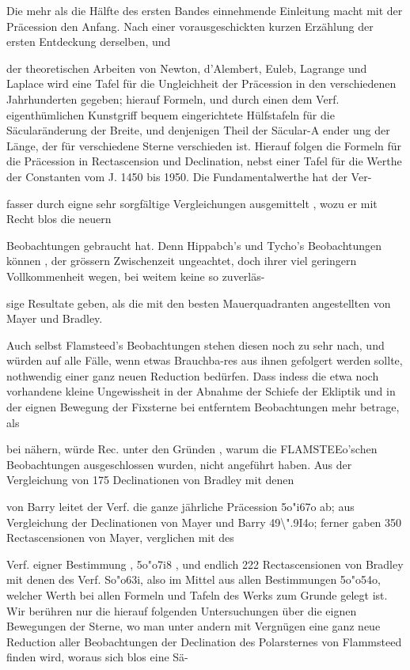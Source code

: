 \documentclass[10pt,a4paper]{article}
\begin{document}
Die mehr als die Hälfte des ersten Bandes einnehmende Einleitung macht mit der Präcession den Anfang. Nach einer vorausgeschickten kurzen Erzählung der ersten Entdeckung derselben, und

der theoretischen Arbeiten von Newton, d'Alembert, Euleb, Lagrange und Laplace wird eine Tafel für die Ungleichheit der Präcession in den verschiedenen Jahrhunderten gegeben; hierauf Formeln, und durch einen dem Verf. eigenthümlichen Kunstgriff bequem eingerichtete Hülfstafeln für die Säcularänderung der Breite, und denjenigen Theil der Säcular-A ender ung der Länge, der für verschiedene Sterne verschieden ist. Hierauf folgen die Formeln für die Präcession in Rectascension und Declination, nebst einer Tafel für die Werthe der Constanten vom J. 1450 bis 1950. Die Fundamentalwerthe hat der Ver-

fasser durch eigne sehr sorgfältige Vergleichungen ausgemittelt , wozu er mit Recht blos die neuern

Beobachtungen gebraucht hat. Denn Hippabch's und Tycho's Beobachtungen können , der grössern Zwischenzeit ungeachtet, doch ihrer viel geringern Vollkommenheit wegen, bei weitem keine so zuverläs-

sige Resultate geben, als die mit den besten Mauerquadranten angestellten von Mayer und Bradley.

Auch selbst Flamsteed's Beobachtungen stehen diesen noch zu sehr nach, und würden auf alle Fälle, wenn etwas Brauchba-res aus ihnen gefolgert werden sollte, nothwendig einer ganz neuen Reduction bedürfen. Dass indess die etwa noch vorhandene kleine Ungewissheit in der Abnahme der Schiefe der Ekliptik und in der eignen Bewegung der Fixsterne bei entferntem Beobachtungen mehr betrage, als

bei nähern, würde Rec. unter den Gründen , warum die FLAMSTEEo'schen Beobachtungen ausgeschlossen wurden, nicht angeführt haben. Aus der Vergleichung von 175 Declinationen von Bradley mit denen

von Barry leitet der Verf. die ganze jährliche Präcession 5o"i67o ab; aus Vergleichung der Declinationen von Mayer und Barry 49\textbackslash{}".9I4o; ferner gaben 350 Rectascensionen von Mayer, verglichen mit des

Verf. eigner Bestimmung , 5o"o7i8 , und endlich 222 Rectascensionen von Bradley mit denen des Verf. So"o63i, also im Mittel aus allen Bestimmungen 5o"o54o, welcher Werth bei allen Formeln und Tafeln des Werks zum Grunde gelegt ist. Wir berühren nur die hierauf folgenden Untersuchungen über die eignen Bewegungen der Sterne, wo man unter andern mit Vergnügen eine ganz neue Reduction aller Beobachtungen der Declination des Polarsternes von Flammsteed finden wird, woraus sich blos eine Sä-
\end{document}
